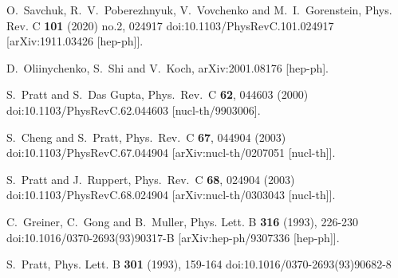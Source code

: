 \documentclass[aps,prc,nofootinbib,showpacs,superscriptaddress,groupedaddress]{revtex4-1}
\begin{document}
\begin{thebibliography}{99}

O.~Savchuk, R.~V.~Poberezhnyuk, V.~Vovchenko and M.~I.~Gorenstein,
Phys. Rev. C \textbf{101} (2020) no.2, 024917
doi:10.1103/PhysRevC.101.024917
[arXiv:1911.03426 [hep-ph]].

  D.~Oliinychenko, S.~Shi and V.~Koch,
  arXiv:2001.08176 [hep-ph].
  
  S.~Pratt and S.~Das Gupta,
  Phys.\ Rev.\ C {\bf 62}, 044603 (2000)
  doi:10.1103/PhysRevC.62.044603
  [nucl-th/9903006].

S.~Cheng and S.~Pratt,
Phys.\ Rev.\ C \textbf{67}, 044904 (2003)
doi:10.1103/PhysRevC.67.044904
[arXiv:nucl-th/0207051 [nucl-th]].

S.~Pratt and J.~Ruppert,
Phys.\ Rev.\ C \textbf{68}, 024904 (2003)
doi:10.1103/PhysRevC.68.024904
[arXiv:nucl-th/0303043 [nucl-th]].

C.~Greiner, C.~Gong and B.~Muller,
Phys. Lett. B \textbf{316} (1993), 226-230
doi:10.1016/0370-2693(93)90317-B
[arXiv:hep-ph/9307336 [hep-ph]].

S.~Pratt,
Phys. Lett. B \textbf{301} (1993), 159-164
doi:10.1016/0370-2693(93)90682-8
















\end{thebibliography}
\end{document}

